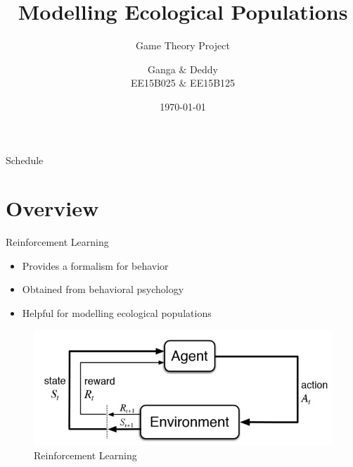 \documentclass{IFES-beamer}
\title[Presentation Template]{Modelling Ecological Populations}
\subtitle{Game Theory Project}
\author{Ganga $\&$ Deddy \\ EE15B025 $\&$ EE15B125}
\institute[IFES]{
  Dynamic Games : Theory and Applications\\
  IIT Madras
}
\date{\today}
\begin{document}
\begin{frame}
  \titlepage
\end{frame}

\begin{frame}{Schedule}
  \tableofcontents
\end{frame}


\section{Overview}

        
    \begin{frame}{Reinforcement Learning}
        \begin{itemize}
            \item Provides a formalism for behavior
            \item Obtained from behavioral psychology
            \item Helpful for modelling ecological populations
        \end{itemize}
        \begin{figure}[H]
                \centering
                \includegraphics[scale=0.4]{Images/RL-intro.png}
                \caption{Reinforcement Learning}
                \label{fig:RL}
            \end{figure}
    \end{frame}
            
\end{document}
